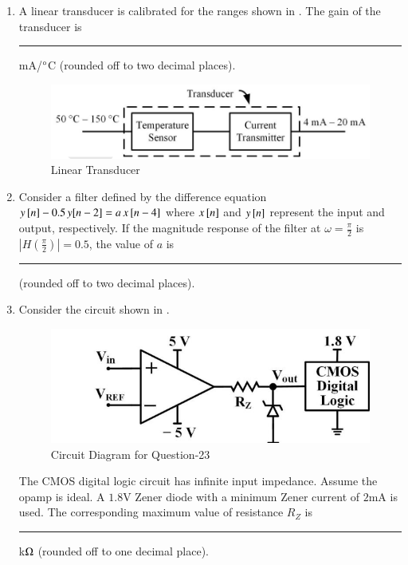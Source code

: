 \documentclass[journal,12pt,onecolumn]{IEEEtran}
\theoremstyle{remark}
\begin{document}
\begin{enumerate}
\item A linear transducer is calibrated for the ranges shown in . The gain of the transducer is \rule{1.5cm}{0.4pt} mA/$\degree$C (rounded off to two decimal places).
\par\hfill{}
\begin{figure}[H]
    \centering
    \includegraphics[width=0.5\columnwidth]{Figs/Q-21.png}
    \caption{Linear Transducer}
    \label{21}
\end{figure}

\item Consider a filter defined by the difference equation $y\sbrak{n} - 0.5\,y[n-2] = a\,x\sbrak{n-4}$ where $x\sbrak{n}$ and $y\sbrak{n}$ represent the input and output, respectively. If the magnitude response of the filter at $\omega = \frac{\pi}{2}$ is $|H(\frac{\pi}{2})| = 0.5$, the value of $a$ is \rule{1.5cm}{0.4pt} (rounded off to two decimal places).
\par\hfill{}

\item Consider the circuit shown in .\\
\begin{figure}[H]
    \centering
    \includegraphics[width=0.5\columnwidth]{Figs/Q-23.png}
    \caption{Circuit Diagram for Question-23}
    \label{23}
\end{figure}
The CMOS digital logic circuit has infinite input impedance. Assume the opamp is ideal. A $1.8$V Zener diode with a minimum Zener current of $2$mA is used. The corresponding maximum value of resistance $R_Z$ is \rule{1.5cm}{0.4pt} k$\ohm$ (rounded off to one decimal place).
\par\hfill{}


\end{enumerate}
\end{document}

